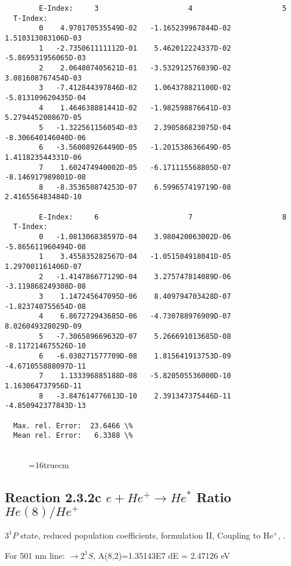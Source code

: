 \documentclass[12pt,dvipdfmx]{article}
\begin{document}
{\begin{small}
\begin{verbatim}
        E-Index:     3                     4                     5
  T-Index:
        0    4.970170535549D-02   -1.165239967844D-02    1.510313083106D-03
        1   -2.735061111112D-01    5.462012224337D-02   -5.869531956065D-03
        2    2.064807405621D-01   -3.532912576039D-02    3.081608767454D-03
        3   -7.412844397846D-02    1.064378821100D-02   -5.813109620435D-04
        4    1.464638881441D-02   -1.982598876641D-03    5.279445200867D-05
        5   -1.322561156054D-03    2.390586823075D-04   -8.306640146040D-06
        6   -3.560089264490D-05   -1.201538636649D-05    1.411823544331D-06
        7    1.602474940002D-05   -6.171115568805D-07   -8.146917989801D-08
        8   -8.353650874253D-07    6.599657419719D-08    2.416556483484D-10

        E-Index:     6                     7                     8
  T-Index:
        0   -1.081306838597D-04    3.980420063002D-06   -5.865611960494D-08
        1    3.455835282567D-04   -1.051504918041D-05    1.297001161406D-07
        2   -1.414786677129D-04    3.275747814089D-06   -3.119868249308D-08
        3    1.147245647095D-06    8.409794703428D-07   -1.823740755654D-08
        4    6.867272943685D-06   -4.730788976909D-07    8.026049328029D-09
        5   -7.306589669632D-07    5.266691013685D-08   -8.117214675526D-10
        6   -6.030271577709D-08    1.815641913753D-09   -4.671055888097D-11
        7    1.133396885188D-08   -5.820505536000D-10    1.163064737956D-11
        8   -3.847614776613D-10    2.391347375446D-11   -4.850942377843D-13

  Max. rel. Error:  23.6466 \%
  Mean rel. Error:   6.3388 \%


\end{verbatim}\end{small}
\begin{figure} \label{2.3.2b}
\epsfxsize=16truecm
\end{figure}
\newpage


\subsection{
  Reaction 2.3.2c $e + He^+ \rightarrow He^*  $ Ratio $He(8)/He^+$
}

  $3^1P$ state,
  reduced population coefficients, formulation II,
  Coupling to He$^+$, \cite{kn:Fujimoto}.

  For 501 nm line: $\rightarrow 2^1S$, A(8,2)=1.35143E7 dE = 2.47126 eV

\begin{small}\begin{verbatim}


\end{verbatim}
\end{small}}
\end{document}
